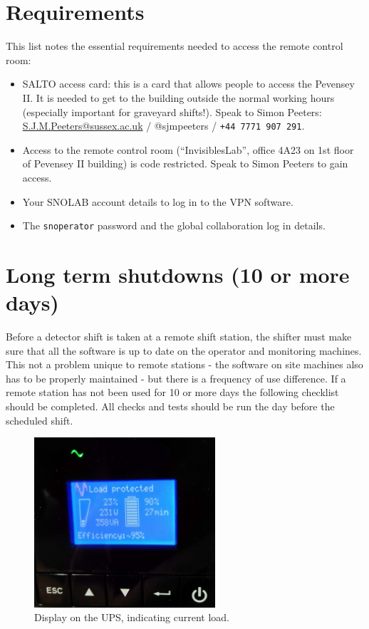 \documentclass[12pt, a4paper]{article}
\begin{document}
\section{Requirements}
This list notes the essential requirements needed to access the remote control room:
\begin{itemize}
	\item SALTO access card: this is a card that allows people to access the Pevensey II. It is needed to get to the building outside the normal working hours (especially important for graveyard shifts!). Speak to Simon Peeters: \\\href{mailto:S.J.M.Peeters@sussex.ac.uk}{S.J.M.Peeters@sussex.ac.uk} / @sjmpeeters / {\tt +44 7771 907 291}.
	\item Access to the remote control room (``InvisiblesLab'', office 4A23 on 1st floor of Pevensey II building) is code restricted.  Speak to Simon Peeters to gain access.
	\item Your SNOLAB account details to log in to the VPN software.
	\item The {\tt snoperator} password and the global collaboration log in details.
\end{itemize}

\section{Long term shutdowns (10 or more days)}
Before a detector shift is taken at a remote shift station, the shifter must make sure that all the software is up to date on the operator and monitoring machines. This not a problem unique to remote stations - the software on site machines also has to be properly maintained - but there is a frequency of use difference. If a remote station has not been used for 10 or more days the following checklist should be completed. All checks and tests should be run the day before the scheduled shift.

\begin{figure}[htp]
	\centering
	\includegraphics[angle=270,width=0.6\textwidth]{images/UPS_display}
	\caption{Display on the UPS, indicating current load.}
	\label{ups_display}
\end{figure}
\end{document}
